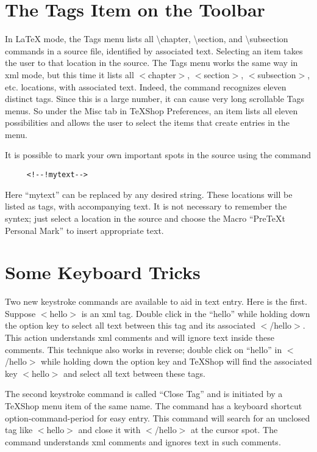 \documentclass[11pt, oneside]{article}   	%
\begin{document}
\section{The Tags Item on the Toolbar}

In LaTeX mode, the Tags menu lists all \textbackslash chapter, \textbackslash section, and \textbackslash subsection commands in a  source file, identified by associated text. Selecting an item takes the user to that location in the source. The Tags menu works the same way in xml mode, but this time it lists all
$<$chapter$>$,  $<$section$>$, $<$subsection$>$, etc. locations, with associated text. Indeed, the command recognizes eleven distinct tags. Since this is a large number, it can cause very long scrollable Tags menus. So under the Misc tab in TeXShop Preferences, an item lists all eleven possibilities and allows the user to select the items that create entries in the menu.

It is possible to mark your own important spots in the source using the command
\begin{verbatim}
     <!--!mytext-->
\end{verbatim}

Here ``mytext'' can be replaced by any desired string. These locations will be listed as tags, with accompanying text. It is not necessary to remember the syntex; just select a location in the source and choose the Macro
``PreTeXt Personal Mark'' to insert appropriate text.

\section{Some Keyboard Tricks}

Two new keystroke commands are available to aid in text entry. Here is the first. Suppose $<$hello$>$ is an xml tag. Double click in the ``hello'' while holding down the option key to select all text between this tag and its associated $<$/hello$>$. This action understands xml comments and will ignore text inside these comments. This technique also works in reverse; double click on ``hello'' in $<$/hello$>$ while holding down the option key and TeXShop will find the associated key $<$hello$>$ and select all text between these tags. 

 
 The second keystroke command is called ``Close Tag'' and is initiated by a TeXShop menu item of the same name. The command has a keyboard shortcut option-command-period for easy entry. This command will search for an unclosed tag like $<$hello$>$ and close it with $<$/hello$>$ at the cursor spot. The command understands xml comments and ignores text in such comments. 
 
\end{document}
